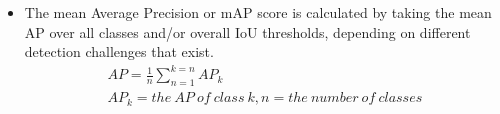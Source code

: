         \begin{itemize}
            \item The mean Average Precision or mAP score is calculated by taking the mean AP over all classes and/or overall IoU thresholds, depending on different detection challenges that exist.
                \begin{align}
                    AP = \frac{1}{n} \sum_{n=1}^{k=n} AP_k \\
                    AP_k = the\:AP\:of\:class\:k, n = the\:number\:of\:classes 
                \end{align}
        \end{itemize}
